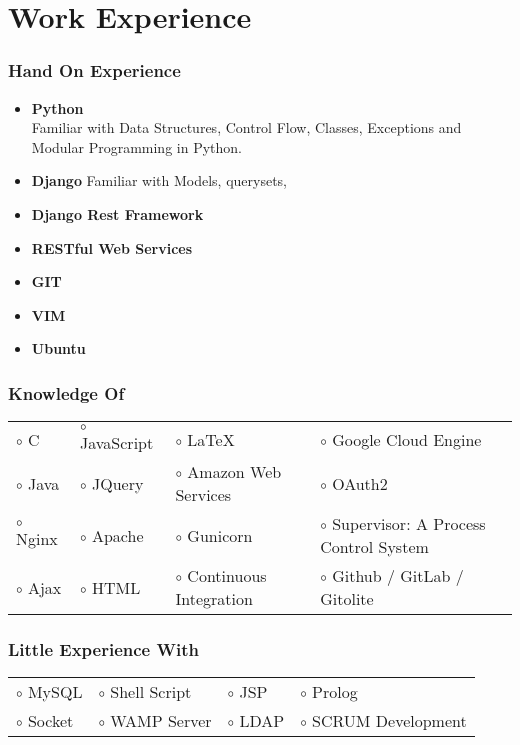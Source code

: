 \documentclass[10pt]{article}
\begin{document}
\section*{Work Experience}

\subsubsection*{Hand On Experience}

\begin{itemize}
 \item \textbf{Python} \\
 Familiar with Data Structures, Control Flow, Classes, Exceptions and Modular Programming in Python.
 \item \textbf{Django}
 Familiar with Models, querysets, 
 \item \textbf{Django Rest Framework}
 \item \textbf{RESTful Web Services}
 \item \textbf{GIT}
 \item \textbf{VIM}
 \item \textbf{Ubuntu}
\end{itemize}

\subsubsection*{Knowledge Of}

\begin{tabular}{l l l l}
 $\circ$ C &
 $\circ$ JavaScript &
 $\circ$ \LaTeX{} &
 $\circ$ Google Cloud Engine \\
 $\circ$ Java &
 $\circ$ JQuery &
 $\circ$ Amazon Web Services &
 $\circ$ OAuth2 \\
 $\circ$ Nginx &
 $\circ$ Apache &
 $\circ$ Gunicorn &
 $\circ$ Supervisor: A Process Control System \\
 $\circ$ Ajax &
 $\circ$ HTML &
 $\circ$ Continuous Integration &
 $\circ$ Github / GitLab / Gitolite \\
\end{tabular}

\subsubsection*{Little Experience With}

\begin{tabular}{l l l l}
 $\circ$ MySQL &
 $\circ$ Shell Script &
 $\circ$ JSP &
 $\circ$ Prolog \\
 $\circ$ Socket &
 $\circ$ WAMP Server &
 $\circ$ LDAP &
 $\circ$ SCRUM Development \\
\end{tabular}
\end{document}
